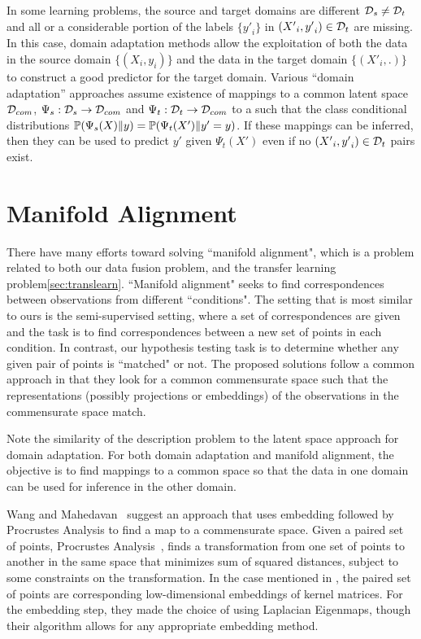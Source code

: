 \documentclass[12pt,oneside,final]{thesis}\usepackage[]{graphicx}\usepackage[]{color}
\begin{document}
 In some learning problems, the source and target domains are different ${\mathcal{D}}_s \neq {\mathcal{D}}_t$ and all or a considerable portion of  the labels $\{{y'}_i\}$  in $\left({X'}_i,{y'}_i\right) \in {\mathcal{D}}_t$ are missing. In this case, domain adaptation methods allow the exploitation of both the  data in the source domain $\{\left({X}_i,{y}_i\right)\}$ and the data in the target domain  $\{\left({X'}_i,.\right)\}$ to construct a good predictor for the target domain\cite{DaumeIII2006,Ben-David_Dom_Adapt2007,Ling2008,Pan2008a}.
Various ``domain adaptation'' approaches\cite{Pan2008a,LowRankSharedConceptChen2012a} assume existence of mappings to a common latent space ${\mathcal{D}}_{com}$,  $\Psi_s:{\mathcal{D}}_s \rightarrow {\mathcal{D}}_{com} $ and $\Psi_t:{\mathcal{D}}_t \rightarrow {\mathcal{D}}_{com}$ to a  such that the class conditional distributions $\mathbb{P}(\Psi_s(X) \|y) = \mathbb{P}(\Psi_t(X') \| y'=y)$. If these mappings can be inferred, then they can be used to predict $y'$ given $\Psi_t(X')$ even if no $\left({X'}_i,{y'}_i\right) \in {\mathcal{D}}_t$ pairs exist. 

\section[Manifold Matching]{Manifold Alignment}
There have many efforts toward solving ``manifold alignment", which is a problem related to both our data fusion problem, and the transfer learning problem\ref{sec:translearn}. ``Manifold alignment" seeks to find correspondences between observations from different ``conditions". The setting that is most similar to ours is the semi-supervised setting, where a set of correspondences are given and the task is to find correspondences between a new set of points in each condition. In contrast, our hypothesis testing task is to determine whether any given pair of points is ``matched" or not. The proposed solutions follow a common approach in that they look for a common commensurate space such that the representations (possibly projections or embeddings) of the observations in the commensurate space match.

Note the similarity of the description problem to the latent space approach for domain adaptation. For both domain adaptation and manifold alignment, the objective is to find mappings to a  common space  so that the data in  one domain can be used for inference in the other domain.

Wang and Mahedavan~\cite{Wang2008} suggest an  approach that uses embedding followed by Procrustes Analysis to find a map to a commensurate space. Given a paired set of points, Procrustes Analysis~\cite{Sibson}, finds a transformation from one set of points to another in the same space that minimizes sum of squared distances, subject to some constraints on the transformation. In the case mentioned in \cite{Wang2008}, the paired set of points are corresponding low-dimensional embeddings of kernel matrices.   For the embedding step, they made the choice of using Laplacian Eigenmaps, though their algorithm allows for any appropriate embedding method.
\end{document}

